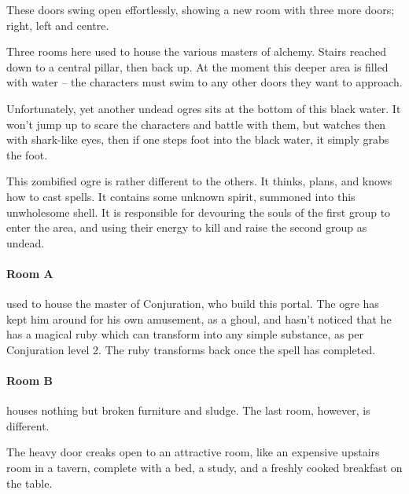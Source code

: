 \begin{multicols}{2}
\begin{enumerate}
\end{enumerate}


\begin{boxtext}
	These doors swing open effortlessly, showing a new room with three more doors; right, left and centre.

\end{boxtext}

Three rooms here used to house the various masters of alchemy.  Stairs reached down to a central pillar, then back up.  At the moment this deeper area is filled with water -- the characters must swim to any other doors they want to approach.

Unfortunately, yet another undead ogres sits at the bottom of this black water.  It won't jump up to scare the characters and battle with them, but watches then with shark-like eyes, then if one steps foot into the black water, it simply grabs the foot.

This zombified ogre is rather different to the others.  It thinks, plans, and knows how to cast spells.  It contains some unknown spirit, summoned into this unwholesome shell.  It is responsible for devouring the souls of the first group to enter the area, and using their energy to kill and raise the second group as undead.

\label{undead_ogre}

\paragraph{Room A} used to house the master of Conjuration, who build this portal.  The ogre has kept him around for his own amusement, as a ghoul, and hasn't noticed that he has a magical ruby which can transform into any simple substance, as per Conjuration level 2.  The ruby transforms back once the spell has completed.


\paragraph{Room B} houses nothing but broken furniture and sludge.  The last room, however, is different.

\begin{boxtext}
	The heavy door creaks open to an attractive room, like an expensive upstairs room in a tavern, complete with a bed, a study, and a freshly cooked breakfast on the table.
\end{boxtext}


\end{multicols}
